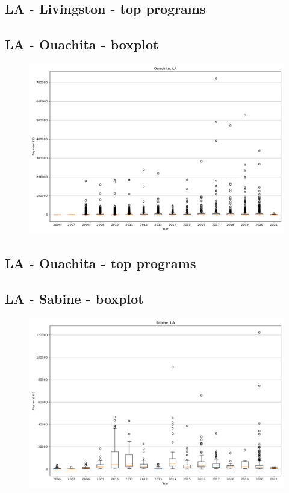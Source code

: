 \subsection*{LA - Livingston - top programs}

\newpage
\subsection*{LA - Ouachita - boxplot}
\begin{figure}[h]
\centering
\includegraphics[width=7in]{../output/boxplots/counties/Ouachita-LA_boxplot.png}
\end{figure}


\subsection*{LA - Ouachita - top programs}

\newpage
\subsection*{LA - Sabine - boxplot}
\begin{figure}[h]
\centering
\includegraphics[width=7in]{../output/boxplots/counties/Sabine-LA_boxplot.png}
\end{figure}


